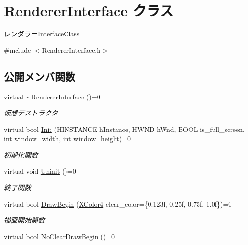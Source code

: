 \hypertarget{class_renderer_interface}{}\section{Renderer\+Interface クラス}
\label{class_renderer_interface}


レンダラー\+Interface\+Class  




{\ttfamily \#include $<$Renderer\+Interface.\+h$>$}

\subsection*{公開メンバ関数}
\begin{DoxyCompactItemize}
\item 
virtual \mbox{\hyperlink{class_renderer_interface_a571638543a7544e023dc186f7dfc7523}{$\sim$\+Renderer\+Interface}} ()=0
\begin{DoxyCompactList}\small\item\em 仮想デストラクタ \end{DoxyCompactList}\item 
virtual bool \mbox{\hyperlink{class_renderer_interface_aabef76c27c2332c1af2dbcf7e8de5d38}{Init}} (H\+I\+N\+S\+T\+A\+N\+CE h\+Instance, H\+W\+ND h\+Wnd, B\+O\+OL is\+\_\+full\+\_\+screen, int window\+\_\+width, int window\+\_\+height)=0
\begin{DoxyCompactList}\small\item\em 初期化関数 \end{DoxyCompactList}\item 
virtual void \mbox{\hyperlink{class_renderer_interface_ada105489f9db98e7e9542b278699d558}{Uninit}} ()=0
\begin{DoxyCompactList}\small\item\em 終了関数 \end{DoxyCompactList}\item 
virtual bool \mbox{\hyperlink{class_renderer_interface_a8fad8e69ef40358a29e8dd75e4dbc7bd}{Draw\+Begin}} (\mbox{\hyperlink{_vector3_d_8h_a680c30c4a07d86fe763c7e01169cd6cc}{X\+Color4}} clear\+\_\+color=\{0.\+123f, 0.\+25f, 0.\+75f, 1.\+0f\})=0
\begin{DoxyCompactList}\small\item\em 描画開始関数 \end{DoxyCompactList}\item 
virtual bool \mbox{\hyperlink{class_renderer_interface_a3274ae0eea630ead1af76b1aac32f420}{No\+Clear\+Draw\+Begin}} ()=0

\end{DoxyCompactItemize}
